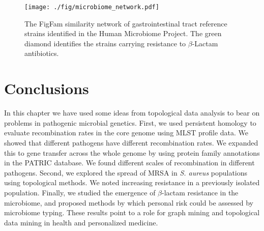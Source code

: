 \begin{figure}[t]
\centering
\texttt{[image: ./fig/microbiome\_network.pdf]}
\caption[FigFam similarity network of the gastrointestinal tract]{The FigFam similarity network of gastrointestinal tract reference strains identified in the Human Microbiome Project. The green diamond identifies the strains carrying resistance to $\beta$-Lactam antibiotics.}
\label{fig:microbiome_network}
\end{figure}

\section{Conclusions}

In this chapter we have used some ideas from topological data analysis to bear on problems in pathogenic microbial genetics.
First, we used persistent homology to evaluate recombination rates in the core genome using MLST profile data.
We showed that different pathogens have different recombination rates.
We expanded this to gene transfer across the whole genome by using protein family annotations in the PATRIC database.
We found different scales of recombination in different pathogens.
Second, we explored the spread of MRSA in \emph{S. aureus} populations using topological methods.
We noted increasing resistance in a previously isolated population.
Finally, we studied the emergence of $\beta$-lactam resistance in the microbiome, and proposed methods by which personal risk could be assessed by microbiome typing.
These results point to a role for graph mining and topological data mining in health and personalized medicine.